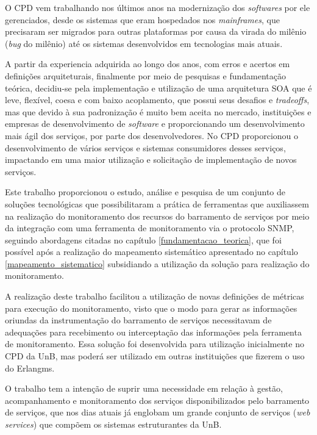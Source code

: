 \label{conclusao}

O \acrshort{CPD} vem trabalhando nos últimos anos na modernização dos \textit{softwares} por ele gerenciados, desde os sistemas que eram hospedados nos \textit{mainframes}, que precisaram ser migrados para outras plataformas por causa da virada do milênio (\textit{bug} do milênio) até os sistemas desenvolvidos em tecnologias mais atuais. 

A partir da experiencia adquirida ao longo dos anos, com erros e acertos em definições arquiteturais, finalmente por meio de pesquisas e fundamentação teórica, decidiu-se pela implementação e utilização de uma arquitetura \acrshort{SOA} que é leve, flexível, coesa e com baixo acoplamento, que possui seus desafios e \textit{tradeoffs}, mas que devido à sua padronização é muito bem aceita no mercado, instituições e empresas de desenvolvimento de \textit{software} e proporcionando um desenvolvimento mais ágil dos serviços, por parte dos desenvolvedores. No \acrshort{CPD} proporcionou o desenvolvimento de vários serviços e sistemas consumidores desses serviços, impactando em uma maior utilização e solicitação de implementação de novos serviços.      

Este trabalho proporcionou o estudo, análise e pesquisa de um conjunto de soluções tecnológicas que possibilitaram a prática de ferramentas que auxiliassem na realização do monitoramento dos recursos do barramento de serviços por meio da integração com uma ferramenta de monitoramento via o protocolo \acrshort{SNMP}, seguindo  abordagens citadas no capítulo \ref{fundamentacao_teorica}, que foi possível após a realização do mapeamento sistemático apresentado no capítulo \ref{mapeamento_sistematico} subsidiando a utilização da solução para realização do monitoramento.  

A realização deste trabalho facilitou a utilização de novas definições de métricas para execução do monitoramento, visto que o modo para gerar as informações oriundas da instrumentação do barramento de serviços necessitavam de adequações para recebimento ou interceptação das informações pela ferramenta de monitoramento. Essa solução foi desenvolvida para utilização inicialmente no \acrshort{CPD} da \acrshort{UnB}, mas poderá ser utilizado em outras instituições que fizerem o uso do Erlangms. 

O trabalho tem a intenção de suprir uma necessidade em relação à gestão, acompanhamento e monitoramento dos serviços disponibilizados pelo barramento de serviços, que nos dias atuais já englobam um grande conjunto de serviços (\textit{web services}) que compõem os sistemas estruturantes da \acrshort{UnB}.


